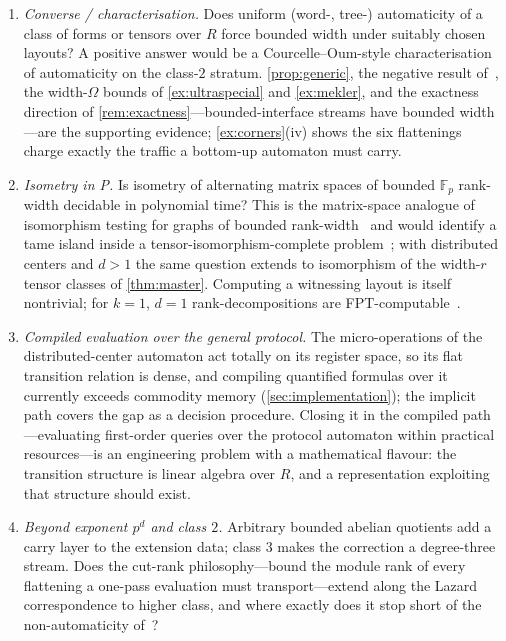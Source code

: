 \documentclass[a4paper,UKenglish,autoref,anonymous]{lipics-v2021}
\newcommand{\Fp}{\mathbb{F}_p}
\newcommand{\R}{R}                                   %
\begin{document}
\begin{enumerate}
\item \emph{Converse / characterisation.} Does uniform (word-, tree-)
  automaticity of a class of forms or tensors over $\R$ force bounded
  width under suitably chosen layouts? A positive answer would be a
  Courcelle--Oum-style characterisation~\cite{CourcelleOum2007} of
  automaticity on the class-$2$ stratum. \autoref{prop:generic}, the
  negative result of~\cite{NiesStephan2023}, the width-$\Omega$ bounds
  of \autoref{ex:ultraspecial} and \autoref{ex:mekler}, and the
  exactness direction of \autoref{rem:exactness}---bounded-interface
  streams have bounded width---are the supporting evidence;
  \autoref{ex:corners}(iv) shows the six flattenings charge exactly the
  traffic a bottom-up automaton must carry.
\item \emph{Isometry in P.} Is isometry of alternating matrix spaces of
  bounded $\Fp$ rank-width decidable in polynomial time? This is the
  matrix-space analogue of isomorphism testing for graphs of bounded
  rank-width~\cite{GroheSchweitzer2015} and would identify a tame
  island inside a tensor-isomorphism-complete
  problem~\cite{GrochowQiao2021}; with distributed centers and $d > 1$
  the same question extends to isomorphism of the width-$r$ tensor
  classes of \autoref{thm:master}. Computing a witnessing layout is
  itself nontrivial; for $k = 1$, $d = 1$ rank-decompositions are
  FPT-computable~\cite{HlinenyOum2008}.
\item \emph{Compiled evaluation over the general protocol.} The
  micro-operations of the distributed-center automaton act totally on
  its register space, so its flat transition relation is dense, and
  compiling quantified formulas over it currently exceeds commodity
  memory (\autoref{sec:implementation}); the implicit path covers the
  gap as a decision procedure. Closing it in the compiled
  path---evaluating first-order queries over the protocol automaton
  within practical resources---is an engineering problem with a
  mathematical flavour: the transition structure is linear algebra over
  $\R$, and a representation exploiting that structure should exist.
\item \emph{Beyond exponent $p^d$ and class $2$.} Arbitrary bounded
  abelian quotients add a carry layer to the extension data; class $3$
  makes the correction a degree-three stream. Does the cut-rank
  philosophy---bound the module rank of every flattening a one-pass
  evaluation must transport---extend along the Lazard correspondence to
  higher class, and where exactly does it stop short of the
  non-automaticity of~\cite{NiesStephan2023}?
\end{enumerate}
\end{document}
